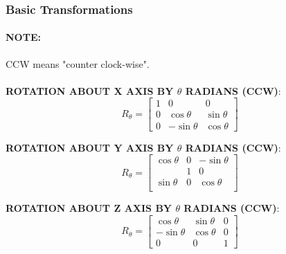 \documentclass{article}
\begin{document}
\subsubsection{Basic Transformations}

\paragraph{\textbf{NOTE: }} CCW means "counter clock-wise".
\paragraph{}

\textbf{ROTATION ABOUT X AXIS BY $\theta$ RADIANS (CCW)}:
\begin{equation}
	R_{\theta} = 
	\left[ \begin{matrix}
	1 & 0 & 0 \\
	0 & \cos \theta & \sin \theta \\
	0 & -\sin \theta & \cos \theta
	\end{matrix} \right]
	\label{eq:rotation-about-x}
\end{equation}

\textbf{ROTATION ABOUT Y AXIS BY $\theta$ RADIANS (CCW)}:
\begin{equation}
	R_{\theta} = 
	\left[ \begin{matrix}
	\cos \theta & 0 & -\sin \theta \\
	& 1 & 0 \\
	\sin \theta & 0 & \cos \theta \\
	\end{matrix} \right]
	\label{eq:rotation-about-y}
\end{equation}

\textbf{ROTATION ABOUT Z AXIS BY $\theta$ RADIANS (CCW)}:
\begin{equation}
	R_{\theta} = 
	\left[ \begin{matrix}
	\cos \theta & \sin \theta & 0 \\
	-\sin \theta & \cos \theta & 0 \\
	0 & 0 & 1
	\end{matrix} \right]
	\label{eq:rotation-about-x}
\end{equation}
\end{document}
